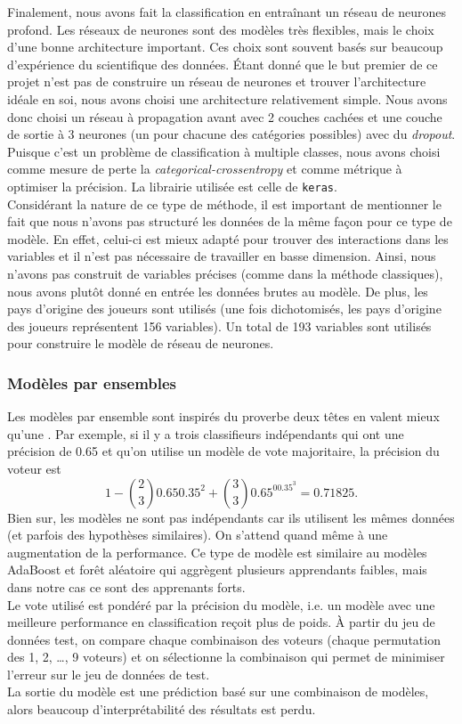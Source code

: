 Finalement, nous avons fait la classification en entraînant un réseau de neurones profond. Les réseaux de neurones sont des modèles très flexibles, mais le choix d'une bonne architecture important. Ces choix sont souvent basés sur beaucoup d'expérience du scientifique des données. Étant donné que le but premier de ce projet n'est pas de construire un réseau de neurones et trouver l'architecture idéale en soi, nous avons choisi une architecture relativement simple. Nous avons donc choisi un réseau à propagation avant avec 2 couches cachées et une couche de sortie à 3 neurones (un pour chacune des catégories possibles) avec du \textit{dropout}. Puisque c'est un problème de classification à multiple classes, nous avons choisi comme mesure de perte la \textit{categorical-crossentropy} et comme métrique à optimiser la précision. La librairie utilisée est celle de \texttt{keras}.\\

Considérant la nature de ce type de méthode, il est important de mentionner le fait que nous n'avons pas structuré les données de la même façon pour ce type de modèle. En effet, celui-ci est mieux adapté pour trouver des interactions dans les variables et il n'est pas nécessaire de travailler en basse dimension. Ainsi, nous n'avons pas construit de variables précises (comme dans la méthode classiques), nous avons plutôt donné en entrée les données brutes au modèle. De plus, les pays d'origine des joueurs sont utilisés (une fois dichotomisés, les pays d'origine des joueurs représentent 156 variables). Un total de 193 variables sont utilisés pour construire le modèle de réseau de neurones.

\subsubsection{Modèles par ensembles}

Les modèles par ensemble sont inspirés du proverbe \guillemotleft deux têtes en valent mieux qu'une \guillemotright. Par exemple, si il y a trois classifieurs indépendants qui ont une précision de 0.65 et qu'on utilise un modèle de vote majoritaire, la précision du voteur est 
$$1 - \binom{2}{3}0.650.35^2 + \binom{3}{3}0.65^00.35^3 = 0.71825.$$
Bien sur, les modèles ne sont pas indépendants car ils utilisent les mêmes données (et parfois des hypothèses similaires). On s'attend quand même à une augmentation de la performance. Ce type de modèle est similaire au modèles AdaBoost et forêt aléatoire qui aggrègent plusieurs apprendants faibles, mais dans notre cas ce sont des apprenants forts.\\

Le vote utilisé est pondéré par la précision du modèle, i.e. un modèle avec une meilleure performance en classification reçoit plus de poids. À partir du jeu de données test, on compare chaque combinaison des voteurs (chaque permutation des 1, 2, \dots, 9 voteurs) et on sélectionne la combinaison qui permet de minimiser l'erreur sur le jeu de données de test.\\

La sortie du modèle est une prédiction basé sur une combinaison de modèles, alors beaucoup d'interprétabilité des résultats est perdu.
